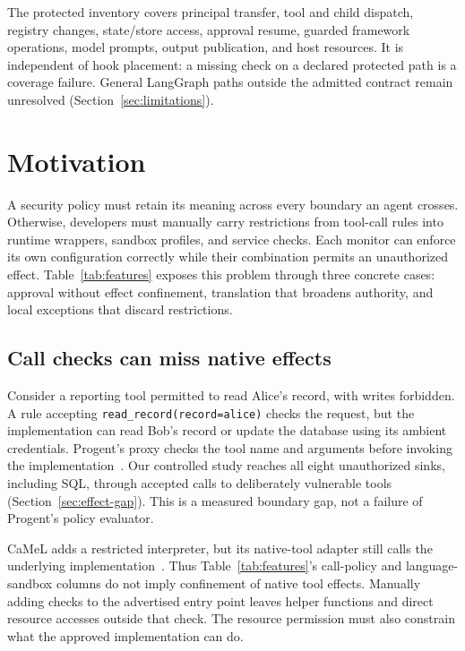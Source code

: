 \documentclass[letterpaper,twocolumn,10pt]{article}
\newcommand{\code}[1]{\texttt{#1}}
\begin{document}
The protected inventory covers principal transfer, tool and child dispatch,
registry changes, state/store access, approval resume, guarded framework
operations, model prompts, output publication, and host resources. It is
independent of hook placement: a missing check on a declared protected path is a
coverage failure. General LangGraph paths outside the admitted contract remain
unresolved (Section~\ref{sec:limitations}).

\section{Motivation}
\label{sec:gap}

A security policy must retain its meaning across every boundary an agent
crosses. Otherwise, developers must manually carry restrictions from tool-call
rules into runtime wrappers, sandbox profiles, and service checks. Each monitor
can enforce its own configuration correctly while their combination permits an
unauthorized effect. Table~\ref{tab:features} exposes this problem through three
concrete cases: approval without effect confinement, translation that broadens
authority, and local exceptions that discard restrictions.

\subsection{Call checks can miss native effects}

Consider a reporting tool permitted to read Alice's record, with writes forbidden.
A rule accepting \code{read\_record(record=alice)} checks the request, but the
implementation can read Bob's record or update the database using its ambient
credentials. Progent's proxy checks the tool name and arguments before invoking
the implementation~\cite{progent,progentcode}. Our controlled study reaches all
eight unauthorized sinks, including SQL, through accepted calls to deliberately
vulnerable tools (Section~\ref{sec:effect-gap}). This is a measured boundary gap,
not a failure of Progent's policy evaluator.

CaMeL adds a restricted interpreter, but its native-tool adapter still calls
the underlying implementation~\cite{camel,camelcode}. Thus Table~\ref{tab:features}'s
call-policy and language-sandbox columns do not imply confinement of native tool
effects. Manually adding checks to the advertised entry point leaves helper
functions and direct resource accesses outside that check. The resource
permission must also constrain what the approved implementation can do.
\end{document}
